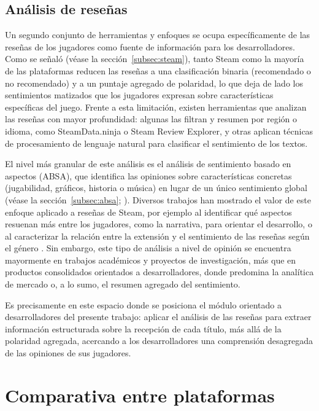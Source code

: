 \subsection{Análisis de reseñas}\label{subsec:analisis_resenas}

Un segundo conjunto de herramientas y enfoques se ocupa específicamente de las reseñas de los jugadores como fuente de información para los desarrolladores. Como se señaló (véase la sección~\ref{subsec:steam}), tanto Steam como la mayoría de las plataformas reducen las reseñas a una clasificación binaria (recomendado o no recomendado) y a un puntaje agregado de polaridad, lo que deja de lado los sentimientos matizados que los jugadores expresan sobre características específicas del juego. Frente a esta limitación, existen herramientas que analizan las reseñas con mayor profundidad: algunas las filtran y resumen por región o idioma, como SteamData.ninja o Steam Review Explorer, y otras aplican técnicas de procesamiento de lenguaje natural para clasificar el sentimiento de los textos.

El nivel más granular de este análisis es el análisis de sentimiento basado en aspectos (ABSA), que identifica las opiniones sobre características concretas (jugabilidad, gráficos, historia o música) en lugar de un único sentimiento global (véase la sección~\ref{subsec:absa}; \parencite{ZhangEtAl2022}). Diversos trabajos han mostrado el valor de este enfoque aplicado a reseñas de Steam, por ejemplo al identificar qué aspectos resuenan más entre los jugadores, como la narrativa, para orientar el desarrollo, o al caracterizar la relación entre la extensión y el sentimiento de las reseñas según el género \parencite{GuzsvineczSzucs2023}. Sin embargo, este tipo de análisis a nivel de opinión se encuentra mayormente en trabajos académicos y proyectos de investigación, más que en productos consolidados orientados a desarrolladores, donde predomina la analítica de mercado o, a lo sumo, el resumen agregado del sentimiento.

Es precisamente en este espacio donde se posiciona el módulo orientado a desarrolladores del presente trabajo: aplicar el análisis de las reseñas para extraer información estructurada sobre la recepción de cada título, más allá de la polaridad agregada, acercando a los desarrolladores una comprensión desagregada de las opiniones de sus jugadores.

\section{Comparativa entre plataformas}\label{sec:comparativa_plataformas}

